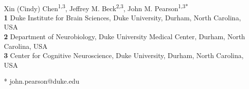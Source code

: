 \documentclass[10pt,letterpaper]{article}
\date{}
\begin{document}
\vspace*{0.2in}

\begin{flushleft}
{\Large
\textbf{} %
}
\newline
\\
Xin (Cindy) Chen\textsuperscript{1,3},
Jeffrey M. Beck\textsuperscript{2,3},
John M. Pearson\textsuperscript{1,3*}
\\
\bigskip
\textbf{1} Duke Institute for Brain Sciences, Duke University, Durham, North Carolina, USA
\\
\textbf{2} Department of Neurobiology, Duke University Medical Center, Durham, North Carolina, USA
\\
\textbf{3} Center for Cognitive Neuroscience, Duke University, Durham, North Carolina, USA
\bigskip

%
%


* john.pearson@duke.edu

\end{flushleft}
\end{document}
